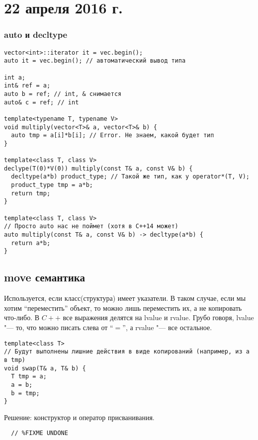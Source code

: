\section{22 апреля 2016 г.}

\subsubsection{auto и decltype}
\begin{verbatim}
vector<int>::iterator it = vec.begin();
auto it = vec.begin(); // автоматический вывод типа

int a;
int& ref = a;
auto b = ref; // int, & снимается
auto& c = ref; // int

template<typename T, typename V>
void multiply(vector<T>& a, vector<T>& b) {
  auto tmp = a[i]*b[i]; // Error. Не знаем, какой будет тип
}

template<class T, class V>
declype(T(0)*V(0)) multiply(const T& a, const V& b) {
  decltype(a*b) product_type; // Такой же тип, как у operator*(T, V);
  product_type tmp = a*b;
  return tmp;
}

template<class T, class V>
// Просто auto нас не поймет (хотя в C++14 может)
auto multiply(const T& a, const V& b) -> decltype(a*b) {
  return a*b;
}
\end{verbatim}

\subsection{move семантика}
Используется, если класс(структура) имеет указатели. В таком случае, если мы хотим ``переместить'' объект, то можно лишь переместить их, а не копировать что-либо.
В $C++$ все выражения делятся на lvalue и rvalue. Грубо говоря, lvalue "--- то, что можно писать слева от ``$=$'', а rvalue "--- все остальное.
\begin{verbatim}
template<class T>
// Будут выполнены лишние действия в виде копирований (например, из a в tmp)
void swap(T& a, T& b) {
  T tmp = a;
  a = b;
  b = tmp;
}
\end{verbatim}
Решение: конструктор и оператор присванивания.
\begin{verbatim}
  // %FIXME UNDONE
\end{verbatim}
